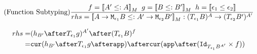 {$$
\treerule{Function Subtyping}{f = \deno{A' \subtype A} \s\s g = \deno{B \subtype B'} \s\s h=\dse{\e_1}{\e_2}}{rhs = \deno{\lamtype{A}{\e_1}{B} \subtype \lamtype{A'}{\e_2}{B'}}: (\T{\e_1}{B})^A \rightarrow (\T{\e_2}{B'})^{A'}}
$$

\begin{equation}
    \begin{split}
        rhs = & (h_{B'} \after \T{\e_1}{g})^{A'}
        \after (\T{\e_1}{B})^f \\
        = & \cur{h_{B'}  \after \T{\e_1}{g}\after \app} \after \cur{\app \after (\Id{\T{\e_1}{B}^{A'}} \times f)}\\
    \end{split}
\end{equation}
}

\ifdefined\NoDocument
\else
\documentclass{report}


    \CategoryRequirements{}

\fi
